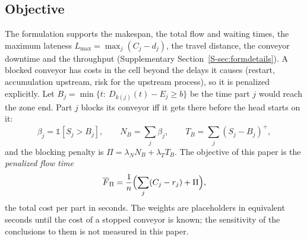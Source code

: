\documentclass[11pt,a4paper]{article}
\theoremstyle{plain}
\theoremstyle{definition}
\theoremstyle{remark}
\newcommand{\Fpi}{\overline F_\Pi}
\newcommand{\Supp}[1]{Supplementary Section~\ref{S-#1}}
\begin{document}
\subsection{Objective}
The formulation supports the makespan, the total flow and waiting times, the maximum
lateness $L_{\max}=\max_j(C_j-d_j)$, the travel distance, the conveyor downtime and the
throughput (\Supp{sec:formdetails}). A blocked conveyor has costs in the cell beyond the delays
it causes (restart, accumulation upstream, risk for the upstream process), so it is
penalized explicitly. Let $B_j=\min\{t:\ D_{k(j)}(t)-E_j\ge b\}$ be the time part $j$ would
reach the zone end. Part $j$ blocks its conveyor iff it gets there before the head starts
on it:
\begin{equation}\label{eq:block}
\beta_j=\mathbb 1[S_j>B_j],\qquad N_B=\sum_j\beta_j,\qquad T_B=\sum_j(S_j-B_j)^+ ,
\end{equation}
and the blocking penalty is $\Pi=\lambda_N N_B+\lambda_T T_B$. The objective of this paper
is the \emph{penalized flow time}
\begin{equation}\label{eq:J}
\Fpi=\frac1n\Bigl(\sum_j(C_j-r_j)+\Pi\Bigr),
\end{equation}
the total cost per part in seconds. The weights are placeholders in equivalent seconds
until the cost of a stopped conveyor is known; the sensitivity of the conclusions to them is
not measured in this paper.
\end{document}
